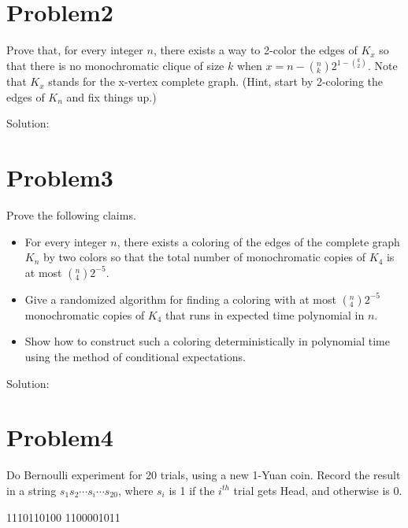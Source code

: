\documentclass[12pt]{article}
\begin{document}
\section{Problem2}
Prove that, for every integer $n$, there exists a way to 2-color the edges of $K_x$ so that there is no monochromatic clique of size $k$ when $x = n - ({}_k^n) 2^{1-({}_2^k)}$. Note that $K_x$ stands for the x-vertex complete graph. (Hint, start by 2-coloring the edges of $K_n$ and fix things up.)

Solution:\\

\section{Problem3}
Prove the following claims.
\begin{itemize}
\item For every integer $n$, there exists a coloring of the edges of the complete graph $K_n$ by two colors so that the total number of monochromatic copies of $K_4$ is at most $({}_4^n) 2^{-5}$.
\item Give a randomized algorithm for finding a coloring with at most $({}_4^n) 2^{-5}$ monochromatic copies of $K_4$ that runs in expected time polynomial in $n$.
\item Show how to construct such a coloring deterministically in polynomial time using the method of conditional expectations.
\end{itemize}

Solution:\\

\section{Problem4}
Do Bernoulli experiment for 20 trials, using a new 1-Yuan coin. Record the result in a
string $s_1s_2 \cdots s_i \cdots s_{20}$, where $s_i$ is 1 if the $i^{th}$ trial gets Head, and otherwise is 0.

1110110100 1100001011
\end{document}
